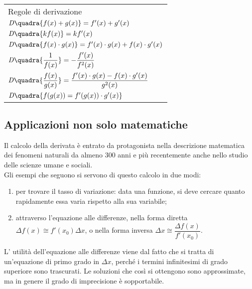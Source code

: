 \begin{center}
\begin{tabular}{l}
\vspace{.5em}  Regole di derivazione\\\vspace{.5em}
$\mathit{D}\quadra{f(x)+g(x)}=f'(x)+g'(x)$\\\vspace{.5em}
$\mathit{D}\quadra{kf(x)}=kf'(x)$\\\vspace{.5em}
$\mathit{D}\quadra{f(x)\cdot g(x)}=f'(x)\cdot g(x)+f(x)\cdot 
g'(x)$\\\vspace{.5em}
$\mathit{D}\quadra{\dfrac{1}{f(x)}}=-\dfrac{f'(x)}{f^2(x)}$\\\vspace{.5em}
$\mathit{D}\quadra{\dfrac{f(x)}{g(x)}}=\dfrac{f'(x)\cdot g(x)-f(x)
    \cdot g'(x)}{g^2(x)}$\\\vspace{.5em}
$\mathit{D}\quadra{f(g(x))=f'(g(x))\cdot g'(x)}$
\end{tabular}
\end{center}
\label{tab:diff01_regolederivazione}

\subsection{Applicazioni non solo matematiche}
Il calcolo della derivata è entrato da protagonista nella descrizione 
matematica dei fenomeni naturali da almeno $300$ anni e più recentemente
anche nello studio delle scienze umane e sociali. \\
Gli esempi che seguono si servono di questo calcolo in due modi:
\begin{enumerate}[noitemsep]
 \item per trovare il tasso di variazione:
data una funzione, si deve cercare quanto rapidamente essa varia rispetto
alla sua variabile;
 \item attraverso l'equazione alle differenze, 
nella forma diretta $\Delta f(x)\cong f'(x_0)\Delta x$, o nella forma
inversa $\Delta x \cong \dfrac{\Delta f(x)}{f'(x_0)}$.
\end{enumerate}
L' utilità dell'equazione alle differenze viene dal
fatto che si tratta di un'equazione di primo grado in $\Delta x$, perché i 
termini infinitesimi di grado superiore sono trascurati. Le soluzioni che 
così
si ottengono sono approssimate, ma in genere il grado di imprecisione è 
sopportabile.

